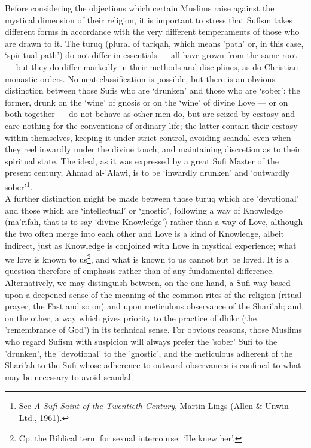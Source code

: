 \documentclass[10pt, twoside]{book}
\begin{document}
Before considering the objections which certain Muslims raise against the mystical dimension of their 
religion, it is important to stress that Sufism takes different forms in accordance with the very 
different temperaments of those who are drawn to it. The turuq (plural of tariqah, which means 'path' 
or, in this case, `spiritual path') do not differ in essentials --- all have grown from the same root --- 
but they do differ markedly in their methods and disciplines, as do Christian monastic orders. No 
neat classification is possible, but there is an obvious distinction between those Sufis who are 
`drunken' and those who are `sober': the former, drunk on the `wine' of gnosis or on the `wine' of 
divine Love --- or on both together --- do not behave as other men do, but are seized by ecstasy and care 
nothing for the conventions of ordinary life; the latter contain their ecstasy within themselves, 
keeping it under strict control, avoiding scandal even when they reel inwardly under the divine 
touch, and maintaining discretion as to their spiritual state. The ideal, as it was expressed by a 
great Sufi Master of the present century, Ahmad al\hyp{}'Alawi, is to be `inwardly drunken' and `outwardly 
sober'\footnote{See \emph{A Sufi Saint of the Twentieth Century}, Martin Lings (Allen \& Unwin Ltd., 1961).}.\\

A further distinction might be made between those turuq which are 'devotional' and those which are 
`intellectual' or `gnostic', following a way of Knowledge (ma'rifah, that is to say `divine 
Knowledge') rather than a way of Love, although the two often merge into each other and Love is a 
kind of Knowledge, albeit indirect, just as Knowledge is conjoined with Love in mystical experience; 
what we love is known to us\footnote{Cp. the Biblical term for sexual intercourse: `He knew her'.}, and what is known to us cannot but be loved. It is a question 
therefore of emphasis rather than of any fundamental difference. \\

Alternatively, we may distinguish between, on the one hand, a Sufi way based upon a deepened sense of 
the meaning of the common rites of the religion (ritual prayer, the Fast and so on) and upon 
meticulous observance of the Shari'ah; and, on the other, a way which gives priority to the practice 
of dhikr (the 'remembrance of God') in its technical sense. For obvious reasons, those Muslims who 
regard Sufism with suspicion will always prefer the 'sober' Sufi to the 'drunken', the 'devotional' 
to the 'gnostic', and the meticulous adherent of the Shari'ah to the Sufi whose adherence to outward 
observances is confined to what may be necessary to avoid scandal. \\
\end{document}
